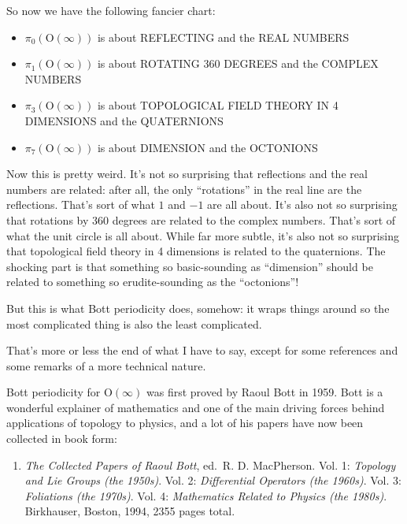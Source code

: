 \documentclass{article}
\def\tightlist{}
\begin{document}
So now we have the following fancier chart:

\begin{itemize}
\tightlist
\item
  \(\pi_0(\mathrm{O}(\infty))\) is about REFLECTING and the REAL NUMBERS
\item
  \(\pi_1(\mathrm{O}(\infty))\) is about ROTATING 360 DEGREES and the
  COMPLEX NUMBERS
\item
  \(\pi_3(\mathrm{O}(\infty))\) is about TOPOLOGICAL FIELD THEORY IN 4
  DIMENSIONS and the QUATERNIONS
\item
  \(\pi_7(\mathrm{O}(\infty))\) is about DIMENSION and the OCTONIONS
\end{itemize}

Now this is pretty weird. It's not so surprising that reflections and
the real numbers are related: after all, the only ``rotations'' in the
real line are the reflections. That's sort of what \(1\) and \(-1\) are
all about. It's also not so surprising that rotations by 360 degrees are
related to the complex numbers. That's sort of what the unit circle is
all about. While far more subtle, it's also not so surprising that
topological field theory in 4 dimensions is related to the quaternions.
The shocking part is that something so basic-sounding as ``dimension''
should be related to something so erudite-sounding as the ``octonions''!

But this is what Bott periodicity does, somehow: it wraps things around
so the most complicated thing is also the least complicated.

That's more or less the end of what I have to say, except for some
references and some remarks of a more technical nature.

Bott periodicity for \(\mathrm{O}(\infty)\) was first proved by Raoul
Bott in 1959. Bott is a wonderful explainer of mathematics and one of
the main driving forces behind applications of topology to physics, and
a lot of his papers have now been collected in book form:

\begin{enumerate}
\def\labelenumi{\arabic{enumi})}
\tightlist
\item
  \emph{The Collected Papers of Raoul Bott}, ed.~R. D. MacPherson. Vol.
  1: \emph{Topology and Lie Groups (the 1950s)}. Vol. 2:
  \emph{Differential Operators (the 1960s)}. Vol. 3: \emph{Foliations
  (the 1970s)}. Vol. 4: \emph{Mathematics Related to Physics (the
  1980s)}. Birkhauser, Boston, 1994, 2355 pages total.
\end{enumerate}
\end{document}
